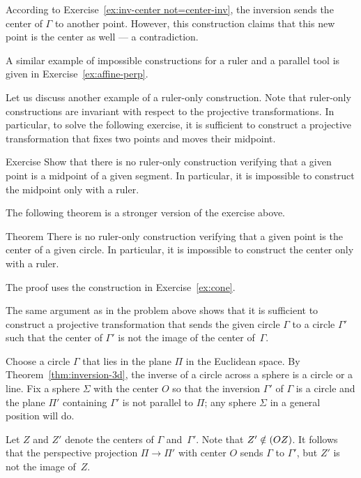 According to Exercise~\ref{ex:inv-center not=center-inv}, 
the inversion sends the center of $\Gamma$ to another point.
However, this construction claims that this new point is the center as well --- a contradiction.
\qeds

A similar example of impossible constructions for a ruler and a parallel tool
 is given in Exercise~\ref{ex:affine-perp}.
 
Let us discuss another example of a ruler-only construction.
Note that ruler-only constructions are invariant with respect to the projective transformations. 
In particular, to solve the following exercise, it is sufficient to construct a projective transformation that fixes two points and moves their midpoint.

\begin{thm}{Exercise}\label{ex:midpoint-proj}
Show that there is no ruler-only construction verifying that a given point is a  midpoint of a given segment.
In particular, it is impossible to construct the midpoint only with a ruler.
\end{thm}

The following theorem is a stronger version of the exercise above.

\begin{thm}{Theorem}\label{thm:circle-center-proj}
There is no ruler-only construction verifying that a given point is the center of a given circle.
In particular, it is impossible to construct the center only with a ruler.
\end{thm}

The proof uses the construction in Exercise~\ref{ex:cone}.

The same argument as in the problem above shows that 
it is sufficient to construct a projective transformation 
that sends the given circle $\Gamma$ to a circle $\Gamma'$ such that the center of $\Gamma'$ is not the image of the center of~$\Gamma$.

Choose a circle $\Gamma$ that lies in the plane $\Pi$ in the Euclidean space.
By Theorem~\ref{thm:inversion-3d}, 
the inverse of a circle across a sphere is a circle or a line.
Fix a sphere $\Sigma$ with the center $O$ so that the inversion $\Gamma'$ of $\Gamma$
is a circle and the plane $\Pi'$ containing $\Gamma'$ is not parallel to $\Pi$;
any sphere $\Sigma$ in a general position will do.

Let $Z$ and $Z'$ denote the centers of $\Gamma$ and~$\Gamma'$.
Note that  $Z'\z\notin(OZ)$.
It follows that the perspective projection $\Pi\to \Pi'$ with center $O$ sends $\Gamma$ to $\Gamma'$, but $Z'$ is not the image of~$Z$.
\qeds

